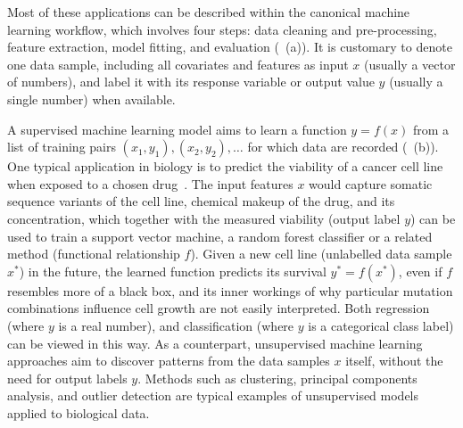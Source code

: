 Most of these applications can be described within the canonical machine learning workflow, which involves four steps: data cleaning and pre-processing, feature extraction, model fitting, and evaluation (~(a)). It is customary to denote one data sample, including all covariates and features as input $x$ (usually a vector of numbers), and label it with its response variable or output value $y$ (usually a single number) when available.

A supervised machine learning model aims to learn a function $y=f(x)$ from a list of training pairs $(x_1,y_1), (x_2,y_2),\ldots$ for which data are recorded (~(b)). One typical application in biology is to predict the viability of a cancer cell line when exposed to a chosen drug~\citep{eduati_prediction_2015,menden_machine_2013}. The input features $x$ would capture somatic sequence variants of the cell line, chemical makeup of the drug, and its concentration, which together with the measured viability (output label $y$) can be used to train a support vector machine, a random forest classifier or a related method (functional relationship $f$). Given a new cell line (unlabelled data sample $x^*$) in the future, the learned function predicts its survival $y^*=f(x^*)$, even if $f$ resembles more of a black box, and its inner workings of why particular mutation combinations influence cell growth are not easily interpreted. Both regression (where $y$ is a real number), and classification (where $y$ is a categorical class label) can be viewed in this way. As a counterpart, unsupervised machine learning approaches aim to discover patterns from the data samples $x$ itself, without the need for output labels $y$. Methods such as clustering, principal components analysis, and outlier detection are typical examples of unsupervised models applied to biological data.

